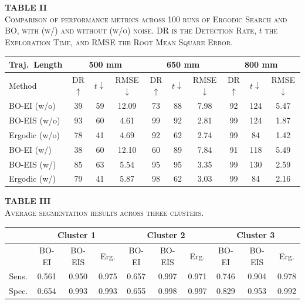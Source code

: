 \documentclass[11pt]{article}
\begin{document}
\begin{center}
\textbf{TABLE II}\\[2pt]
\textsc{Comparison of performance metrics across 100 runs of Ergodic
Search and BO, with (w/) and without (w/o) noise. DR is the Detection
Rate, $t$ the Exploration Time, and RMSE the Root Mean Square Error.}
\end{center}

\begin{center}
\footnotesize
\begin{tabular}{|l|ccc|ccc|ccc|}
\hline
Traj.\ Length
  & \multicolumn{3}{c|}{500 mm}
  & \multicolumn{3}{c|}{650 mm}
  & \multicolumn{3}{c|}{800 mm} \\
\hline
Method & DR $\uparrow$ & $t\downarrow$ & RMSE$\downarrow$
       & DR $\uparrow$ & $t\downarrow$ & RMSE$\downarrow$
       & DR $\uparrow$ & $t\downarrow$ & RMSE$\downarrow$ \\
\hline
BO-EI (w/o)   & 39 & 59 & 12.09 & 73 & 88 & 7.98 & 92 & 124 & 5.47 \\
BO-EIS (w/o)  & 93 & 60 &  4.61 & 99 & 92 & 2.81 & 99 & 124 & 1.87 \\
Ergodic (w/o) & 78 & 41 &  4.69 & 92 & 62 & 2.74 & 99 &  84 & 1.42 \\
BO-EI (w/)    & 38 & 60 & 12.10 & 60 & 89 & 7.84 & 91 & 118 & 5.49 \\
BO-EIS (w/)   & 85 & 63 &  5.54 & 95 & 95 & 3.35 & 99 & 130 & 2.59 \\
Ergodic (w/)  & 79 & 41 &  5.87 & 98 & 62 & 3.03 & 99 &  84 & 2.16 \\
\hline
\end{tabular}
\end{center}

\vspace{0.6em}

\begin{center}
\textbf{TABLE III}\\[2pt]
\textsc{Average segmentation results across three clusters.}
\end{center}

\begin{center}
\footnotesize
\begin{tabular}{|c|ccc|ccc|ccc|}
\hline
 & \multicolumn{3}{c|}{Cluster 1}
 & \multicolumn{3}{c|}{Cluster 2}
 & \multicolumn{3}{c|}{Cluster 3} \\
\hline
 & BO-EI & BO-EIS & Erg. & BO-EI & BO-EIS & Erg. & BO-EI & BO-EIS & Erg. \\
\hline
Sens. & 0.561 & 0.950 & 0.975 & 0.657 & 0.997 & 0.971 & 0.746 & 0.904 & 0.978 \\
Spec. & 0.654 & 0.993 & 0.993 & 0.655 & 0.998 & 0.997 & 0.829 & 0.953 & 0.992 \\
\hline
\end{tabular}
\end{center}
\end{document}
